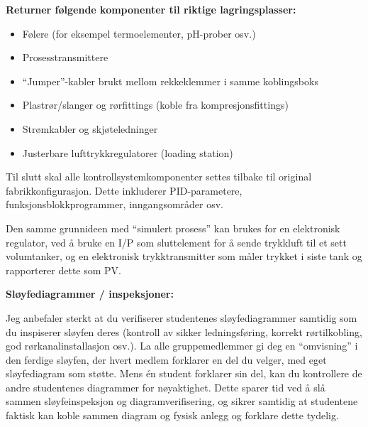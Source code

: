 \vskip 10pt

\indent
{\bf Returner følgende komponenter til riktige lagringsplasser:}

\begin{itemize}
\item{} Følere (for eksempel termoelementer, pH-prober osv.)
\item{} Prosesstransmittere
\item{} ``Jumper''-kabler brukt mellom rekkeklemmer i samme koblingsboks
\item{} Plastrør/slanger og rørfittings (koble fra kompresjonsfittings)
\item{} Strømkabler og skjøteledninger
\item{} Justerbare lufttrykkregulatorer (loading station)
\end{itemize}

\vskip 10pt

Til slutt skal alle kontrollsystemkomponenter settes tilbake til original fabrikkonfigurasjon. Dette inkluderer PID-parametere, funksjonsblokkprogrammer, inngangsområder osv.
















Den samme grunnideen med ``simulert prosess'' kan brukes for en elektronisk regulator, ved å bruke en I/P som sluttelement for å sende trykkluft til et sett volumtanker, og en elektronisk trykktransmitter som måler trykket i siste tank og rapporterer dette som PV.

\vskip 20pt

\noindent
{\bf Sløyfediagrammer / inspeksjoner:}

Jeg anbefaler sterkt at du verifiserer studentenes sløyfediagrammer samtidig som du inspiserer sløyfen deres (kontroll av sikker ledningsføring, korrekt rørtilkobling, god rørkanalinstallasjon osv.). La alle gruppemedlemmer gi deg en ``omvisning'' i den ferdige sløyfen, der hvert medlem forklarer en del du velger, med eget sløyfediagram som støtte. Mens én student forklarer sin del, kan du kontrollere de andre studentenes diagrammer for nøyaktighet. Dette sparer tid ved å slå sammen sløyfeinspeksjon og diagramverifisering, og sikrer samtidig at studentene faktisk kan koble sammen diagram og fysisk anlegg og forklare dette tydelig.



